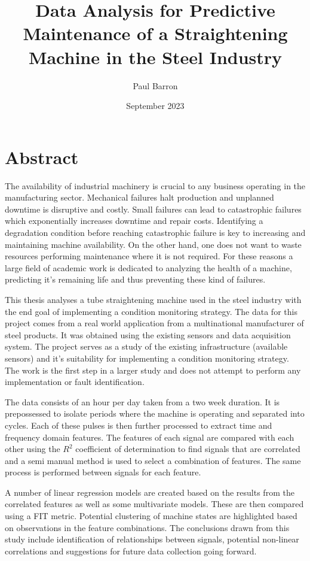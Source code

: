 \documentclass{article}
\title{Data Analysis for Predictive Maintenance of a Straightening Machine in the Steel Industry}
\date{September 2023}
\author{Paul Barron}
\begin{document}
\maketitle
\newpage
{}
\tableofcontents
\newpage

\section{Abstract}
The availability of industrial machinery  is crucial to any business operating in the manufacturing sector. Mechanical failures halt production and unplanned downtime is disruptive and costly. Small failures can lead to catastrophic failures which exponentially increases downtime and repair costs. Identifying a degradation condition before reaching catastrophic failure is key to increasing and maintaining machine availability. On the other hand, one does not want to waste resources performing maintenance where it is not required. For these reasons a large field of academic work is dedicated to analyzing the health of a machine, predicting it's remaining life and thus preventing these kind of failures.

This thesis analyses a tube straightening machine used in the steel industry with the end goal of implementing a condition monitoring strategy. The data for this project comes from a real world application from a multinational manufacturer of steel products. It was obtained using the existing sensors and data acquisition system. The project serves as a study of the existing infrastructure (available sensors) and it's suitability for implementing a condition monitoring strategy. The work is the first step in a larger study and does not attempt to perform any implementation or fault identification.

The data consists of an hour per day taken from a two week duration. It is prepossessed to isolate periods where the machine is operating and separated into cycles. Each of these pulses is then further processed to extract time and frequency domain features. The features of each signal are compared with each other using the $R^{2}$ coefficient of determination to find signals that are correlated and a semi manual method is used to select a combination of features. The same process is performed between signals for each feature. 

A number of linear regression models are created based on the results from the correlated features as well as some multivariate models. These are then compared using a FIT metric. Potential clustering of machine states are highlighted based on observations in the feature combinations. The conclusions drawn from this study include identification of relationships between signals, potential non-linear correlations and suggestions for future data collection going forward.
\clearpage
\end{document}
